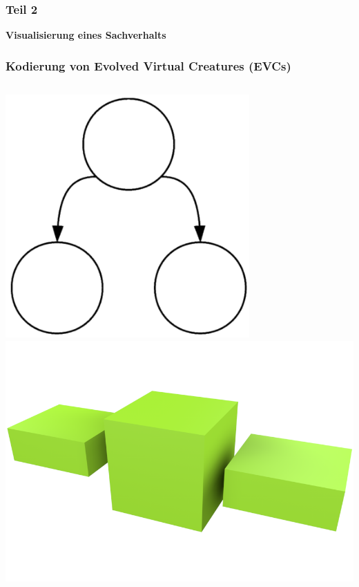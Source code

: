 \documentclass{beamer}
\begin{document}
\begin{frame}
	\frametitle{Teil 2}
	\textbf{Visualisierung eines Sachverhalts}\\
\end{frame}

\begin{frame}
	\frametitle{Kodierung von Evolved Virtual Creatures (EVCs)}
	\begin{columns}[c]
		\centering
		\includegraphics[width=0.7\textwidth]{img/g1.png} \pause
		\centering
		\includegraphics[width=\textwidth]{img/1.png}
	\end{columns}
\end{frame}
\end{document}

